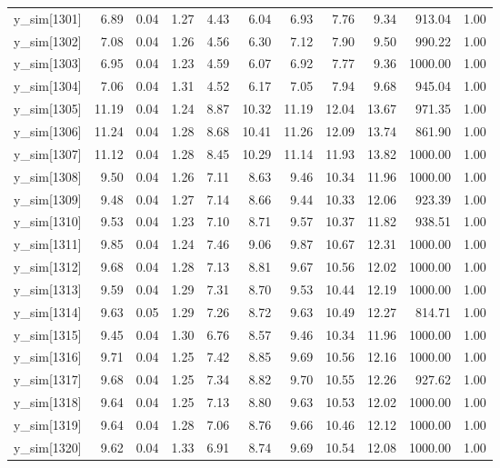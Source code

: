 \begin{table}[ht]
\begin{tabular}{rrrrrrrrrrr}
  y\_sim[1301] & 6.89 & 0.04 & 1.27 & 4.43 & 6.04 & 6.93 & 7.76 & 9.34 & 913.04 & 1.00 \\ 
  y\_sim[1302] & 7.08 & 0.04 & 1.26 & 4.56 & 6.30 & 7.12 & 7.90 & 9.50 & 990.22 & 1.00 \\ 
  y\_sim[1303] & 6.95 & 0.04 & 1.23 & 4.59 & 6.07 & 6.92 & 7.77 & 9.36 & 1000.00 & 1.00 \\ 
  y\_sim[1304] & 7.06 & 0.04 & 1.31 & 4.52 & 6.17 & 7.05 & 7.94 & 9.68 & 945.04 & 1.00 \\ 
  y\_sim[1305] & 11.19 & 0.04 & 1.24 & 8.87 & 10.32 & 11.19 & 12.04 & 13.67 & 971.35 & 1.00 \\ 
  y\_sim[1306] & 11.24 & 0.04 & 1.28 & 8.68 & 10.41 & 11.26 & 12.09 & 13.74 & 861.90 & 1.00 \\ 
  y\_sim[1307] & 11.12 & 0.04 & 1.28 & 8.45 & 10.29 & 11.14 & 11.93 & 13.82 & 1000.00 & 1.00 \\ 
  y\_sim[1308] & 9.50 & 0.04 & 1.26 & 7.11 & 8.63 & 9.46 & 10.34 & 11.96 & 1000.00 & 1.00 \\ 
  y\_sim[1309] & 9.48 & 0.04 & 1.27 & 7.14 & 8.66 & 9.44 & 10.33 & 12.06 & 923.39 & 1.00 \\ 
  y\_sim[1310] & 9.53 & 0.04 & 1.23 & 7.10 & 8.71 & 9.57 & 10.37 & 11.82 & 938.51 & 1.00 \\ 
  y\_sim[1311] & 9.85 & 0.04 & 1.24 & 7.46 & 9.06 & 9.87 & 10.67 & 12.31 & 1000.00 & 1.00 \\ 
  y\_sim[1312] & 9.68 & 0.04 & 1.28 & 7.13 & 8.81 & 9.67 & 10.56 & 12.02 & 1000.00 & 1.00 \\ 
  y\_sim[1313] & 9.59 & 0.04 & 1.29 & 7.31 & 8.70 & 9.53 & 10.44 & 12.19 & 1000.00 & 1.00 \\ 
  y\_sim[1314] & 9.63 & 0.05 & 1.29 & 7.26 & 8.72 & 9.63 & 10.49 & 12.27 & 814.71 & 1.00 \\ 
  y\_sim[1315] & 9.45 & 0.04 & 1.30 & 6.76 & 8.57 & 9.46 & 10.34 & 11.96 & 1000.00 & 1.00 \\ 
  y\_sim[1316] & 9.71 & 0.04 & 1.25 & 7.42 & 8.85 & 9.69 & 10.56 & 12.16 & 1000.00 & 1.00 \\ 
  y\_sim[1317] & 9.68 & 0.04 & 1.25 & 7.34 & 8.82 & 9.70 & 10.55 & 12.26 & 927.62 & 1.00 \\ 
  y\_sim[1318] & 9.64 & 0.04 & 1.25 & 7.13 & 8.80 & 9.63 & 10.53 & 12.02 & 1000.00 & 1.00 \\ 
  y\_sim[1319] & 9.64 & 0.04 & 1.28 & 7.06 & 8.76 & 9.66 & 10.46 & 12.12 & 1000.00 & 1.00 \\ 
  y\_sim[1320] & 9.62 & 0.04 & 1.33 & 6.91 & 8.74 & 9.69 & 10.54 & 12.08 & 1000.00 & 1.00 \\ 

\end{tabular}
\end{table}
